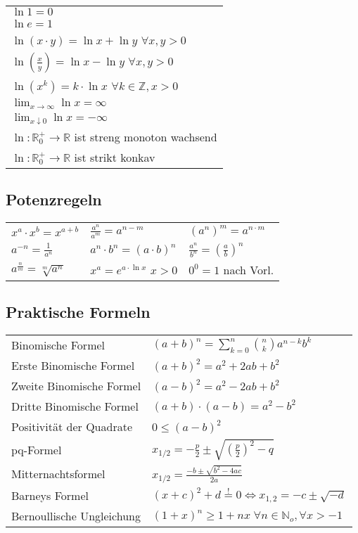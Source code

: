 \documentclass[a4paper,9pt]{extarticle}
\newcommand{\liminfty}[1][n]{\lim_{#1 \to \infty}}
\begin{document}
	\begin{tabular}{l}
		$\ln 1 = 0$ \\
		$\ln e = 1$ \\
		$\ln (x ⋅ y) = \ln x + \ln y$ $\forall x,y > 0$ \\
		$\ln (\frac{x}{y}) = \ln x - \ln y$ $\forall x,y > 0$ \\
		$\ln (x^k) = k ⋅ \ln x$ $\forall k \in \mathbb{Z}, x > 0$ \\
		$\liminfty[x]{\ln x} = ∞ $ \\
		$\lim_{x ↓ 0} \ln x = -∞$ \\
		$\ln : \mathbb{R}_0^+ → \mathbb{R}$ ist streng monoton wachsend \\
		$\ln : \mathbb{R}_0^+ → \mathbb{R}$ ist strikt konkav
	\end{tabular}

	\subsection*{Potenzregeln}

	\begin{tabular}{lll}
		$x^a \cdot x^b = x^{a+b}$ & $\frac{a^n}{a^m} = a^{n-m}$ & $(a^n)^m = a^{n\cdot m}$ \\[1ex]
		$a^{-n} = \frac{1}{a^n}$ & $a^n\cdot b^n = (a\cdot b)^n$ & $\frac{a^n}{b^n} = \left(\frac{a}{b}\right)^n$ \\[1ex]
		$a^\frac{n}{m} = \sqrt[m]{a^n}$ & $x^a = e^{a ⋅ \ln x}$ $x > 0$ & $0^0 = 1$ nach Vorl. \\
	\end{tabular}


	\subsection*{Praktische Formeln}
	
	\begin{tabular}{ll}
		Binomische Formel & $(a+b)^n = \sum\limits_{k=0}^n \binom{n}{k} a^{n-k} b^k$\\
		Erste Binomische Formel & $(a+b)^2 = a^2 +2ab +b^2$\\
		Zweite Binomische Formel & $(a-b)^2 = a^2 -2ab +b^2$\\
		Dritte Binomische Formel & $(a+b) \cdot (a-b) = a^2 -b^2$\\
		Positivität der Quadrate & $0 \leq (a-b)^2$\\
		pq-Formel & $x_{1/2} = - \frac{p}{2} \pm \sqrt{(\frac{p}{2})^2 - q}$\\
		Mitternachtsformel & $x_{1/2} = \frac{-b \pm \sqrt{b^2 - 4ac}}{2a}$\\
		Barneys Formel & $(x + c)^2 + d \stackrel{!}{=} 0 \iff x_{1,2} = -c \pm \sqrt{-d}$ \\
		Bernoullische Ungleichung & $ (1 + x)^n \ge 1 + n x \; \forall n \in \mathbb{N}_o, \forall x > -1 $
	\end{tabular}
\end{document}
